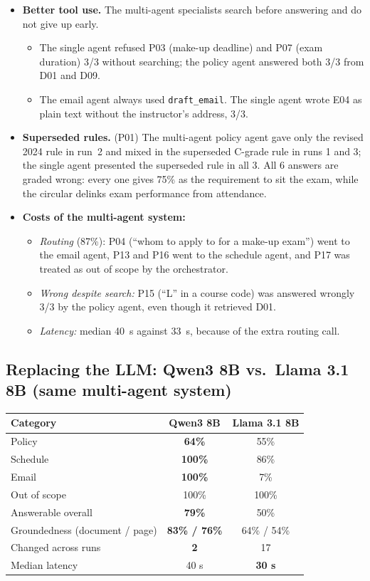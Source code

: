 \documentclass[11pt,a4paper]{article}
\newcommand{\code}[1]{\texttt{#1}}
\begin{document}
\begin{itemize}
  \item \textbf{Better tool use.} The multi-agent specialists search before answering and do not give up early.
    \begin{itemize}
      \item The single agent refused P03 (make-up deadline) and P07 (exam duration) 3/3 without searching; the
            policy agent answered both 3/3 from D01 and D09.
      \item The email agent always used \code{draft\_email}. The single agent wrote E04 as plain text without the
            instructor's address, 3/3.
    \end{itemize}
  \item \textbf{Superseded rules.} (P01) The multi-agent policy agent gave only the revised 2024 rule in run~2 and mixed in the superseded
        C-grade rule in runs 1 and 3; the single agent presented the superseded rule in all 3. All 6 answers are graded
        wrong: every one gives 75\% as the requirement to sit the exam, while the circular delinks exam performance
        from attendance.
  \item \textbf{Costs of the multi-agent system:}
    \begin{itemize}
      \item \emph{Routing} (87\%): P04 (``whom to apply to for a make-up exam'') went to the email agent, P13 and
            P16 went to the schedule agent, and P17 was treated as out of scope by the orchestrator.
      \item \emph{Wrong despite search:} P15 (``L'' in a course code) was answered wrongly 3/3 by the policy agent,
            even though it retrieved D01.
      \item \emph{Latency:} median 40~s against 33~s, because of the extra routing call.
    \end{itemize}
\end{itemize}

\subsection{Replacing the LLM: Qwen3 8B vs.\ Llama 3.1 8B (same multi-agent system)}
\begin{tabular}{@{}lcc@{}}
\toprule
Category & Qwen3 8B & Llama 3.1 8B \\ \midrule
Policy & \textbf{64\%} & 55\% \\
Schedule & \textbf{100\%} & 86\% \\
Email & \textbf{100\%} & 7\% \\
Out of scope & 100\% & 100\% \\
Answerable overall & \textbf{79\%} & 50\% \\
Groundedness (document / page) & \textbf{83\% / 76\%} & 64\% / 54\% \\
Changed across runs & \textbf{2} & 17 \\
Median latency & 40 s & \textbf{30 s} \\
\bottomrule
\end{tabular}
\end{document}
